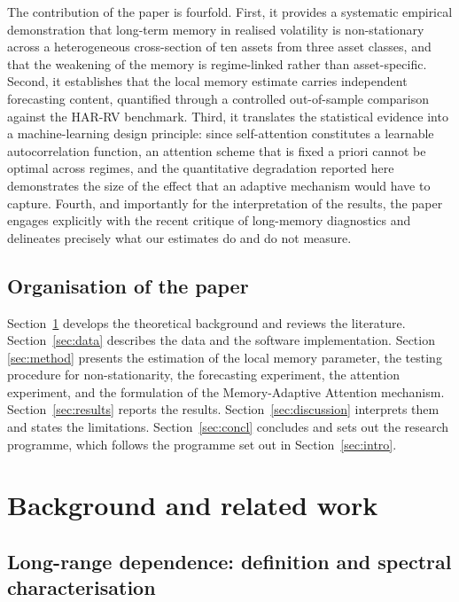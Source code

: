 \documentclass[journal]{IEEEtran}
\begin{document}
The contribution of the paper is fourfold. First, it provides a systematic empirical
demonstration that long-term memory in realised volatility is non-stationary across a
heterogeneous cross-section of ten assets from three asset classes, and that the weakening of the
memory is regime-linked rather than asset-specific. Second, it establishes that the local memory
estimate carries independent forecasting content, quantified through a controlled out-of-sample
comparison against the HAR-RV benchmark. Third, it translates the statistical evidence into a
machine-learning design principle: since self-attention constitutes a learnable autocorrelation
function, an attention scheme that is fixed a priori cannot be optimal across regimes, and the
quantitative degradation reported here demonstrates the size of the effect that an adaptive
mechanism would have to capture. Fourth, and importantly for the interpretation of the results,
the paper engages explicitly with the recent critique of long-memory diagnostics
\cite{gatheral2018rough} and delineates precisely what our estimates do and do not measure.

\subsection{Organisation of the paper}

Section~\ref{sec:related} develops the theoretical background and reviews the literature.
Section~\ref{sec:data} describes the data and the software implementation. Section
\ref{sec:method} presents the estimation of the local memory parameter, the testing procedure for
non-stationarity, the forecasting experiment, the attention experiment, and the formulation of
the Memory-Adaptive Attention mechanism. Section~\ref{sec:results} reports the results.
Section~\ref{sec:discussion} interprets them and states the limitations. Section~\ref{sec:concl}
concludes and sets out the research programme, which follows the programme set out in
Section~\ref{sec:intro}.

\section{Background and related work}\label{sec:related}

\subsection{Long-range dependence: definition and spectral characterisation}
\end{document}
